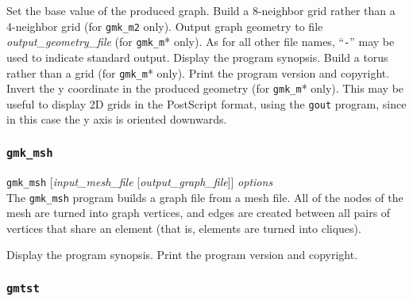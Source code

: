 \begin{itemize}
\progopt
\begin{itemize}
Set the base value of the produced graph.
\iteme[\texttt{-e}]
Build a 8-neighbor grid rather than a 4-neighbor grid (for \texttt{gmk\_m2} only).
Output graph geometry to file {\it output\_geometry\_file}
(for \texttt{gmk\_m}* only).
As for all other file names, ``\texttt{-}''
may be used to indicate standard output.
\iteme[\texttt{-h}]
Display the program synopsis.
\iteme[\texttt{-t}]
Build a torus rather than a grid (for \texttt{gmk\_m}* only).
\iteme[\texttt{-V}]
Print the program version and copyright.
\iteme[\texttt{-y}]
Invert the y coordinate in the produced geometry (for \texttt{gmk\_m}*
only). This may be useful to display 2D grids in the PostScript
format, using the \texttt{gout} program, since in this case the y axis
is oriented downwards.
\end{itemize}
\end{itemize}

\subsubsection{\texttt{gmk\_msh}}
\label{sec-prog-gmkmsh}

\begin{itemize}
\progsyn
\texttt{gmk\_msh} [{\it input\_mesh\_file} [{\it output\_graph\_file}]] {\it options}\\

\progdes
The \texttt{gmk\_msh} program builds a graph file from a mesh file. All
of the nodes of the mesh are turned into graph vertices, and edges
are created between all pairs of vertices that share an element (that
is, elements are turned into cliques).

\progopt
\begin{itemize}
\iteme[\texttt{-h}]
Display the program synopsis.
\iteme[\texttt{-V}]
Print the program version and copyright.
\end{itemize}
\end{itemize}

\subsubsection{\texttt{gmtst}}


